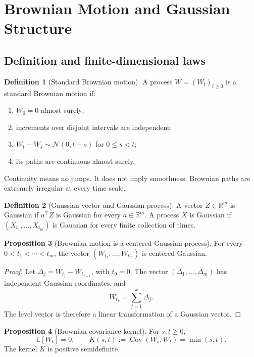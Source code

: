 \documentclass[10pt]{article}
\newcommand{\E}{\mathbb E}
\newcommand{\Cov}{\operatorname{Cov}}
\newcommand{\R}{\mathbb R}
\newcommand{\1}{\mathbf 1}
\theoremstyle{definition}
\newtheorem{definition}{Definition}[section]
\newtheorem{proposition}[definition]{Proposition}
\begin{document}
\section{Brownian Motion and Gaussian Structure}

\subsection{Definition and finite-dimensional laws}

\begin{definition}[Standard Brownian motion]
A process \(W=(W_t)_{t\geq0}\) is a standard Brownian motion if:
\begin{enumerate}[label=(BM\arabic*)]
  \item \(W_0=0\) almost surely;
  \item increments over disjoint intervals are independent;
  \item \(W_t-W_s\sim\mathcal N(0,t-s)\) for \(0\leq s<t\);
  \item its paths are continuous almost surely.
\end{enumerate}
\end{definition}

Continuity means no jumps. It does not imply smoothness: Brownian paths are
extremely irregular at every time scale.

\begin{definition}[Gaussian vector and Gaussian process]
A vector \(Z\in\R^m\) is Gaussian if \(a^\top Z\) is Gaussian for every
\(a\in\R^m\). A process \(X\) is Gaussian if
\((X_{t_1},\ldots,X_{t_m})\) is Gaussian for every finite collection of
times.
\end{definition}

\begin{proposition}[Brownian motion is a centered Gaussian process]
For every \(0<t_1<\cdots<t_m\), the vector
\((W_{t_1},\ldots,W_{t_m})\) is centered Gaussian.
\end{proposition}

\begin{proof}
Let \(\Delta_j=W_{t_j}-W_{t_{j-1}}\), with \(t_0=0\). The vector
\((\Delta_1,\ldots,\Delta_m)\) has independent Gaussian coordinates, and
\[
W_{t_k}=\sum_{j=1}^k\Delta_j.
\]
The level vector is therefore a linear transformation of a Gaussian vector.
\end{proof}

\begin{proposition}[Brownian covariance kernel]
For \(s,t\geq0\),
\[
\E[W_t]=0,
\qquad
K(s,t):=\Cov(W_s,W_t)=\min(s,t).
\]
The kernel \(K\) is positive semidefinite.
\end{proposition}
\end{document}

